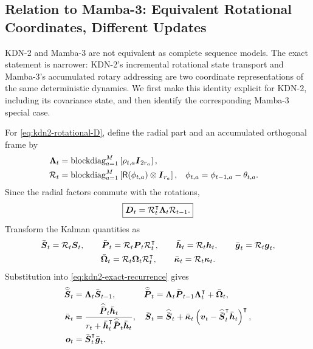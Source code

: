 \documentclass[11pt,letterpaper,logo]{yalearxiv}
\newcommand{\blockdiag}{\operatorname{blockdiag}}
\newcommand{\Rot}{\mathsf{R}}
\begin{document}
\subsection{Relation to Mamba-3: Equivalent Rotational Coordinates, Different Updates}
\label{sec:kdn2-mamba3}

KDN-2 and Mamba-3 are not equivalent as complete sequence models. The exact statement is narrower:
KDN-2's incremental rotational state transport and Mamba-3's accumulated rotary addressing are
two coordinate representations of the same deterministic dynamics. We first make this identity
explicit for KDN-2, including its covariance state, and then identify the corresponding Mamba-3
special case.

For \eqref{eq:kdn2-rotational-D}, define the radial part and an accumulated orthogonal frame by
\begin{equation}
\begin{aligned}
  \ve{\Lambda}_t
  &=
  \blockdiag_{a=1}^{M}
  \left[\rho_{t,a}\ve{I}_{2r_a}\right],
  \\
  \mc R_t
  &=
  \blockdiag_{a=1}^{M}
  \left[\Rot(\phi_{t,a})\otimes\ve{I}_{r_a}\right],
  &
  \phi_{t,a}&=\phi_{t-1,a}-\theta_{t,a}.
\end{aligned}
\label{eq:kdn2-accumulated-frame}
\end{equation}
Since the radial factors commute with the rotations,
\begin{equation}
  \boxed{
  \boldsymbol{D}_t=\mathcal R_t^{\intercal}\boldsymbol{\Lambda}_t\mathcal R_{t-1}.
  }
  \label{eq:kdn2-gauge-factorization}
\end{equation}
Transform the Kalman quantities as
\begin{equation}
\begin{gathered}
  \bar{\boldsymbol{S}}_t=\mathcal R_t\boldsymbol{S}_t,
  \qquad
  \bar{\boldsymbol{P}}_t=\mathcal R_t\boldsymbol{P}_t\mathcal R_t^{\intercal},
  \qquad
  \bar{\boldsymbol{h}}_t=\mathcal R_t\boldsymbol{h}_t,
  \qquad
  \bar{\boldsymbol{g}}_t=\mathcal R_t\boldsymbol{g}_t,
  \\
  \bar{\boldsymbol{\Omega}}_t=\mathcal R_t\boldsymbol{\Omega}_t\mathcal R_t^{\intercal},
  \qquad
  \bar{\boldsymbol{\kappa}}_t=\mathcal R_t\boldsymbol{\kappa}_t.
\end{gathered}
\label{eq:kdn2-gauge-variables}
\end{equation}
Substitution into \eqref{eq:kdn2-exact-recurrence} gives
\begin{equation}
\begin{aligned}
  \widehat{\bar{\boldsymbol{S}}}_t
  &=\boldsymbol{\Lambda}_t\bar{\boldsymbol{S}}_{t-1},
  &
  \widehat{\bar{\boldsymbol{P}}}_t
  &=\boldsymbol{\Lambda}_t\bar{\boldsymbol{P}}_{t-1}\boldsymbol{\Lambda}_t^{\intercal}
    +\bar{\boldsymbol{\Omega}}_t,
  \\
  \bar{\boldsymbol{\kappa}}_t
  &=
  \frac{\widehat{\bar{\boldsymbol{P}}}_t\bar{\boldsymbol{h}}_t}
  {r_t+\bar{\boldsymbol{h}}_t^{\intercal}\widehat{\bar{\boldsymbol{P}}}_t\bar{\boldsymbol{h}}_t},
  &
  \bar{\boldsymbol{S}}_t
  &=
  \widehat{\bar{\boldsymbol{S}}}_t
  +\bar{\boldsymbol{\kappa}}_t
  \left(
    \boldsymbol{v}_t-\widehat{\bar{\boldsymbol{S}}}_t^{\intercal}\bar{\boldsymbol{h}}_t
  \right)^{\intercal},
  \\
  \boldsymbol{o}_t&=\bar{\boldsymbol{S}}_t^{\intercal}\bar{\boldsymbol{g}}_t.
\end{aligned}
\label{eq:kdn2-gauge-filter}
\end{equation}
\end{document}
